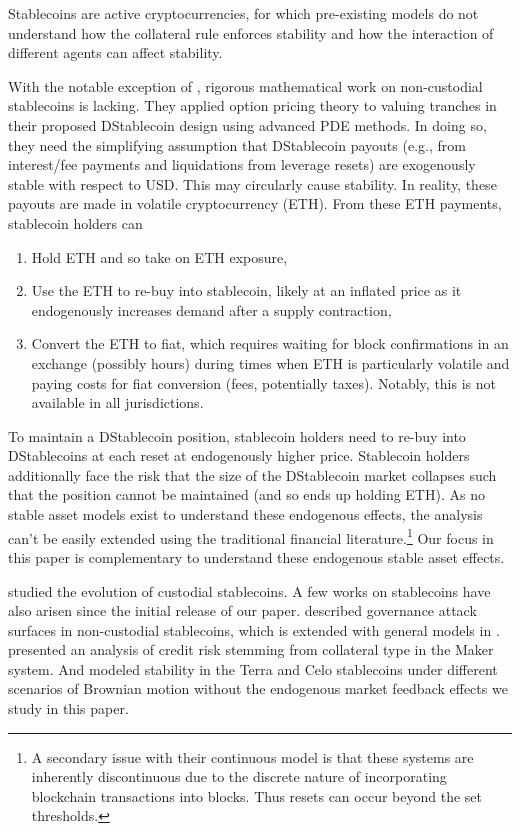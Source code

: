 Stablecoins are active cryptocurrencies, for which pre-existing models do not understand how the collateral rule enforces stability and how the interaction of different agents can affect stability.

With the notable exception of \cite{cao2018}, rigorous mathematical work on non-custodial stablecoins is lacking. They applied option pricing theory to valuing tranches in their proposed DStablecoin design using advanced PDE methods. In doing so, they need the simplifying assumption that DStablecoin payouts (e.g., from interest/fee payments and liquidations from leverage resets) are exogenously stable with respect to USD. This may circularly cause stability. In reality, these payouts are made in volatile cryptocurrency (ETH). From these ETH payments, stablecoin holders can
\begin{enumerate}
	\item Hold ETH and so take on ETH exposure,
	\item Use the ETH to re-buy into stablecoin, likely at an inflated price as it endogenously increases demand after a supply contraction,
	\item Convert the ETH to fiat, which requires waiting for block confirmations in an exchange (possibly hours) during times when ETH is particularly volatile and paying costs for fiat conversion (fees, potentially taxes). Notably, this is not available in all jurisdictions.
\end{enumerate}
To maintain a DStablecoin position, stablecoin holders need to re-buy into DStablecoins at each reset at endogenously higher price. Stablecoin holders additionally face the risk that the size of the DStablecoin market collapses such that the position cannot be maintained (and so ends up holding ETH). As no stable asset models exist to understand these endogenous effects, the analysis can't be easily extended using the traditional financial literature.\footnote{A secondary issue with their continuous model is that these systems are inherently discontinuous due to the discrete nature of incorporating blockchain transactions into blocks. Thus resets can occur beyond the set thresholds.} Our focus in this paper is complementary to understand these endogenous stable asset effects.

\cite{lipton2018} studied the evolution of custodial stablecoins. 
A few works on stablecoins have also arisen since the initial release of our paper.
\cite{klagesmundt2019vuln} described governance attack surfaces in non-custodial stablecoins, which is extended with general models in \cite{klagesmundt2020stablecoins}. \cite{evans2019ratings} presented an analysis of credit risk stemming from collateral type in the Maker system. And \cite{terra2, celo} modeled stability in the Terra and Celo stablecoins under different scenarios of Brownian motion without the endogenous market feedback effects we study in this paper.

